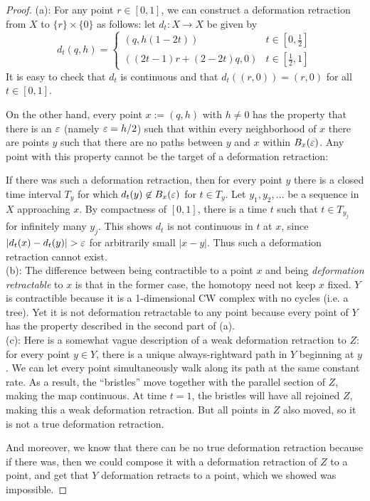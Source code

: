 \documentclass{amsart}
\begin{document}
\begin{proof}
	(a): For any point $r\in [0,1]$, we can construct a deformation retraction from $X$ to $\{r\}\times \{0\}$ as follows: let $d_t:X\to X$ be given by
	$$
	d_t(q,h) = \begin{cases}
		(q,h(1 - 2t)) & t\in [0,\tfrac12]\\
		((2t-1)r+(2-2t)q,0) & t\in [\tfrac12,1]
	\end{cases}
	$$
	It is easy to check that $d_t$ is continuous and that $d_t((r,0)) = (r,0)$ for all $t\in[0,1]$.
	
	On the other hand, every point $x:=(q,h)$ with $h\neq 0$ has the property that there is an $\varepsilon$ (namely $\varepsilon=h/2$) such that within every neighborhood of $x$ there are points $y$ such that there are no paths between $y$ and $x$ within $B_{x}(\varepsilon)$. Any point with this property cannot be the target of a deformation retraction:
	
	If there was such a deformation retraction, then for every point $y$ there is a closed time interval $T_y$ for which $d_t(y)\not\in B_{x}(\varepsilon)$ for $t\in T_y$. Let $y_1,y_2,\dots$ be a sequence in $X$ approaching $x$. By compactness of $[0,1]$, there is a time $t$ such that $t\in T_{y_j}$ for infinitely many $y_j$. This shows $d_t$ is not continuous in $t$ at $x$, since $|d_t(x)-d_t(y)|>\ep$ for arbitrarily small $|x-y|$. Thus such a deformation retraction cannot exist.\\
	
	(b): The difference between being contractible to a point $x$ and being \textit{deformation retractable} to $x$ is that in the former case, the homotopy need not keep $x$ fixed. $Y$ is contractible because it is a 1-dimensional CW complex with no cycles (i.e. a tree). Yet it is not deformation retractable to any point because every point of $Y$ has the property described in the second part of (a).\\
	
	(c): Here is a somewhat vague description of a weak deformation retraction to $Z$: for every point $y\in Y$, there is a unique always-rightward path in $Y$ beginning at $y$. We can let every point simultaneously walk along its path at the same constant rate. As a result, the ``bristles'' move together with the parallel section of $Z$, making the map continuous. At time $t=1$, the bristles will have all rejoined $Z$, making this a weak deformation retraction. But all points in $Z$ also moved, so it is not a true deformation retraction.
	
	And moreover, we know that there can be no true deformation retraction because if there was, then we could compose it with a deformation retraction of $Z$ to a point, and get that $Y$ deformation retracts to a point, which we showed was impossible.
\end{proof}
\end{document}
